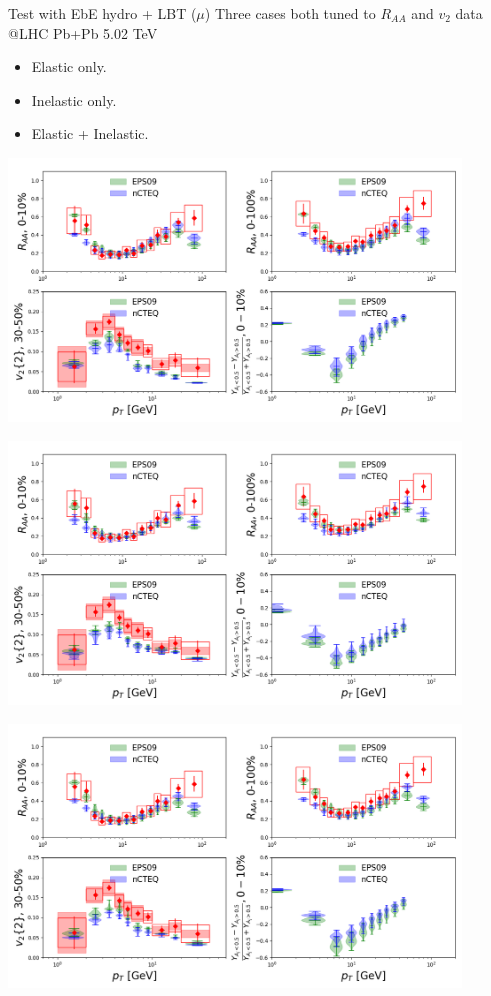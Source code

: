 \documentclass[11pt]{beamer}
\begin{document}
\begin{frame}{Test with EbE hydro + LBT ($\mu$)}
Three cases both tuned to $R_{AA}$ and $v_2$ data @LHC Pb+Pb 5.02 TeV 
\begin{itemize}
\item Elastic only.
\item Inelastic only.
\item Elastic + Inelastic.
\end{itemize}
\begin{overprint}
\begin{center}
\includegraphics[width=0.9\textwidth]{fig/mu-tune/El_obs.png}
\end{center}
\begin{center}
\includegraphics[width=0.9\textwidth]{fig/mu-tune/Inel_obs.png}
\end{center}
\begin{center}
\includegraphics[width=0.9\textwidth]{fig/mu-tune/El_inel_obs.png}
\end{center}
\end{overprint}
\end{frame}
\end{document}
